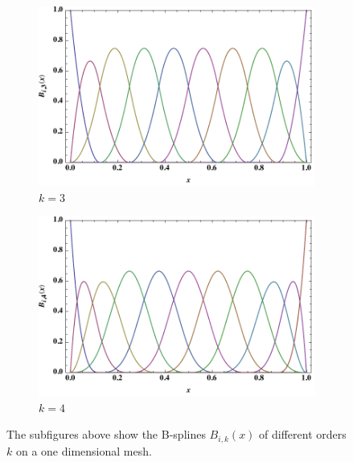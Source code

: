\begin{figure}[htbp!]
\begin{adjustwidth}{-1cm}{-1cm}
\begin{subfigure}{0.6\textwidth}
	\centering
	\includegraphics[width=\linewidth]{Bsp3.pdf}
	\caption{$k=3$}
\end{subfigure}%
\begin{subfigure}{0.6\textwidth}
	\centering
	\includegraphics[width=\linewidth]{Bsp4.pdf}
	\caption{$k=4$}
\end{subfigure}%
	\end{adjustwidth}
	\caption{The subfigures above show the B-splines $B_{i,k}(x)$ of different orders $k$ on a one dimensional mesh.}\label{fig:B-spline}
\end{figure}
